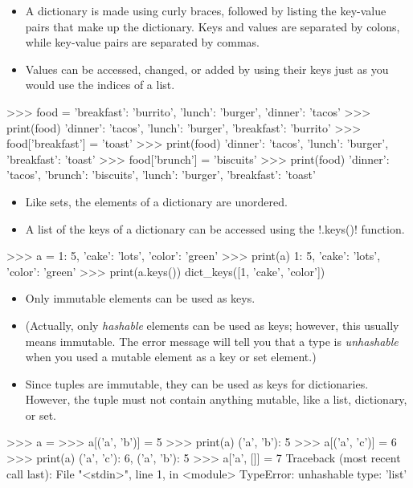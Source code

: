 \documentclass[11pt]{cselabheader}
\begin{document}
\begin{itemize}
  \item A dictionary is made using curly braces, followed by listing the
    key-value pairs that make up the dictionary. Keys and values are separated
    by colons, while key-value pairs are separated by commas.
  \item Values can be accessed, changed, or added by using their keys just as
    you would use the indices of a list.
\end{itemize}
\begin{pyconcode}
>>> food = {'breakfast': 'burrito', 'lunch': 'burger', 'dinner': 'tacos'}
>>> print(food)
{'dinner': 'tacos', 'lunch': 'burger', 'breakfast': 'burrito'}
>>> food['breakfast'] = 'toast'
>>> print(food)
{'dinner': 'tacos', 'lunch': 'burger', 'breakfast': 'toast'}
>>> food['brunch'] = 'biscuits'
>>> print(food)
{'dinner': 'tacos', 'brunch': 'biscuits', 'lunch': 'burger', 'breakfast': 'toast'}
\end{pyconcode}

\begin{itemize}
  \item Like sets, the elements of a dictionary are unordered.

  \item A list of the keys of a dictionary can be accessed using the
    \pythoninline!.keys()! function.
\end{itemize}

\begin{pyconcode}
>>> a = {1: 5, 'cake': 'lots', 'color': 'green'}
>>> print(a)
{1: 5, 'cake': 'lots', 'color': 'green'}
>>> print(a.keys())
dict_keys([1, 'cake', 'color'])
\end{pyconcode}

\begin{itemize}
  \item Only immutable elements can be used as keys.
  \item (Actually, only \emph{hashable} elements can be used as keys; however,
    this usually means immutable. The error message will tell you that a type is
    \emph{unhashable} when you used a mutable element as a key or set element.)
  \item Since tuples are immutable, they can be used as keys for dictionaries.
    However, the tuple must not contain anything mutable, like a list,
    dictionary, or set.
\end{itemize}

\begin{pyconcode}
>>> a = {}
>>> a[('a', 'b')] = 5
>>> print(a)
{('a', 'b'): 5}
>>> a[('a', 'c')] = 6
>>> print(a)
{('a', 'c'): 6, ('a', 'b'): 5}
>>> a['a', []] = 7
Traceback (most recent call last):
  File "<stdin>", line 1, in <module>
TypeError: unhashable type: 'list'
\end{pyconcode}
\end{document}
